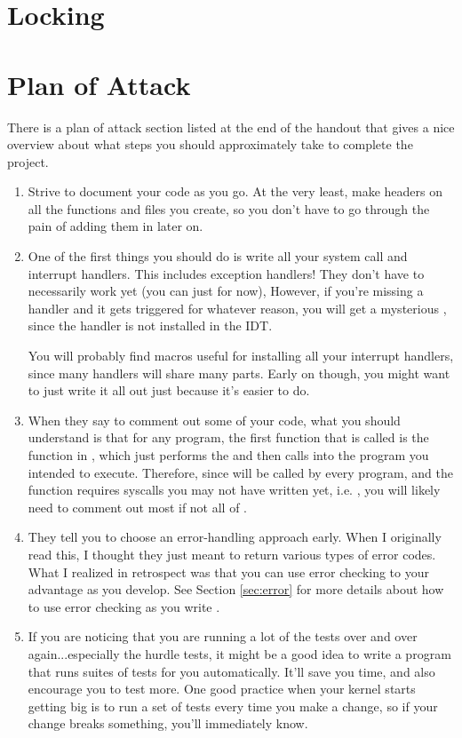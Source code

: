 \documentclass{article}
\begin{document}
\section{Locking}

\section{Plan of Attack}
There is a plan of attack section listed at the end of the handout that gives
a nice overview about what steps you should approximately take to complete the project.

\begin{enumerate}
  \item Strive to document your code as you go. At the very least,
  make  headers on all the functions and files you create,
  so you don't have to go through the pain of adding them in later on.

  \item One of the first things you should do is write all your system call and interrupt handlers.
  This includes exception handlers! They don't have to necessarily work yet (you can just  for now),
  However, if you're missing a handler and it gets triggered for whatever
  reason, you will get a mysterious , since the handler is not installed
  in the IDT.

  You will probably find macros useful for installing all your interrupt handlers, since 
  many handlers will share many parts. Early on though, you might want to just write it all out
  just because it's easier to do.

  \item When they say to comment out some of your  code,
  what you should understand is that for any program, the first function that is called
  is the function in , which just performs the  and
  then calls  into the program you intended to execute. Therefore, since 
   will be called by every program, and the function requires syscalls
  you may not have written yet, i.e. , you will likely need to comment out most
  if not all of .

  \item They tell you to choose an error-handling approach early. When I originally
  read this, I thought they just meant to return various types of error codes.
  What I realized in retrospect was that you can use error checking to your advantage as you
  develop. See Section \ref{sec:error} for more details about how to use error checking
  as you write .

  \item If you are noticing that you are running a lot of the tests over and over again...especially
  the hurdle tests, it might be a good idea to write a program that runs suites of tests for you automatically.
  It'll save you time, and also encourage you to test more. One good practice when your kernel starts
  getting big is to run a set of tests every time you make a change, so if your change breaks something,
  you'll immediately know.
\end{enumerate}
\end{document}
